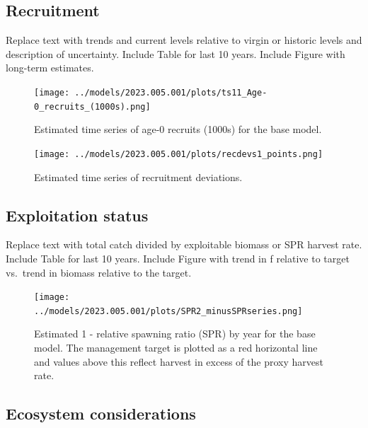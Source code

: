 \documentclass[11pt,
  english,
  letterpaper,
]{article}
\begin{document}
\clearpage

\hypertarget{recruitment}{%
\subsection*{Recruitment}\label{recruitment}}

Replace text with trends and current levels relative to virgin or historic levels and description of uncertainty. Include Table for last 10 years. Include Figure with long-term estimates.



\begin{figure}
\centering
\texttt{[image: ../models/2023.005.001/plots/ts11\_Age-0\_recruits\_(1000s).png]}
\caption{Estimated time series of age-0 recruits (1000s) for the base model.\label{fig:es-recruits}}
\end{figure}

\begin{figure}
\centering
\texttt{[image: ../models/2023.005.001/plots/recdevs1\_points.png]}
\caption{Estimated time series of recruitment deviations.\label{fig:es-rec-devs}}
\end{figure}

\clearpage

\hypertarget{exploitation-status}{%
\subsection*{Exploitation status}\label{exploitation-status}}

Replace text with total catch divided by exploitable biomass or SPR harvest rate. Include Table for last 10 years. Include Figure with trend in f relative to target vs.~trend in biomass relative to the target.



\begin{figure}
\centering
\texttt{[image: ../models/2023.005.001/plots/SPR2\_minusSPRseries.png]}
\caption{Estimated 1 - relative spawning ratio (SPR) by year for the base model. The management target is plotted as a red horizontal line and values above this reflect harvest in excess of the proxy harvest rate.\label{fig:es-1-spr}}
\end{figure}

\clearpage

\hypertarget{ecosystem-considerations}{%
\subsection*{Ecosystem considerations}\label{ecosystem-considerations}}
\end{document}

